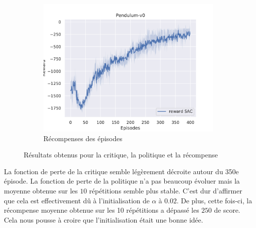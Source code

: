 \begin{figure}[H]
\begin{subfigure}{0.3\textwidth}
    \end{subfigure}
    \begin{subfigure}{0.3\textwidth}
        \includegraphics[width=\textwidth]{figures/sac_itr2/rewards_Pendulum-v0_pg_dataset_td_eval_True_cycles_40_trajs_20_batches_20_gamma_0.99_nstep_5_lr_act_0.01_lr_critic_0.01.pdf}
        \caption{Récompenses des épisodes}
    \end{subfigure}
    \caption{Résultats obtenus pour la critique, la politique et la récompense}
    \label{fig:sac:results2}
\end{figure}

La fonction de perte de la critique semble légèrement décroite autour du 350e épisode. La fonction de perte de la politique n'a pas beaucoup évoluer mais la moyenne obtenue sur les $10$ répétitions semble plus stable. C'est dur d'affirmer que cela est effectivement dû à l'initialisation de $\alpha$ à $0.02$. De plus, cette fois-ci, la récompense moyenne obtenue sur les 10 répétitions a dépassé les $250$ de score. Cela nous pousse à croire que l'initialisation était une bonne idée.

